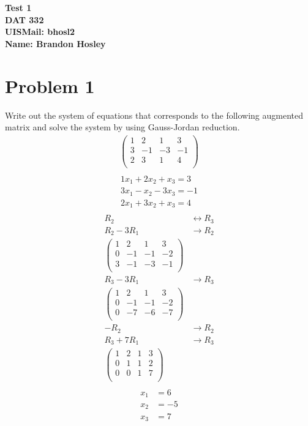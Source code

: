 \documentclass[]{article}
\title{}
\author{}
\begin{document}
	\textbf{
	{\Large Test 1} \\
	DAT 332 \\
	UISMail: bhosl2 \\
	Name: Brandon Hosley
}
\section{Problem 1}
Write out the system of equations that corresponds to the following augmented matrix and solve the system by using Gauss-Jordan reduction.
\begin{align*}
	\begin{pmatrix}
	1 & 2 & 1 & 3 \\
	3 & -1& -3& -1 \\
	2 & 3 & 1 & 4 \\
	\end{pmatrix} \\
\end{align*}
\begin{align}
1x_{1} + 2x_{2} + x_{3} = 3 \\
3x_{1} - x_{2} - 3x_{3} = -1 \\
2x_{1} + 3x_{2} + x_{3} = 4 \\
\end{align}
\begin{align*}
	R_2 &\leftrightarrow R_3 \\
	R_2 - 3R_1 &\rightarrow R_2 \\
	\begin{pmatrix}
		1 & 2 & 1 & 3 \\
		0 &-1 &-1 & -2 \\
		3 &-1 &-3 & -1 \\
	\end{pmatrix} \\
	R_3 - 3R_1 &\rightarrow R_3 \\
	\begin{pmatrix}
		1 & 2 & 1 & 3 \\
		0 &-1 &-1 & -2 \\
		0 &-7 &-6 & -7 \\
	\end{pmatrix} \\
	-R_2 &\rightarrow R_2 \\
	R_3 + 7R_1 &\rightarrow R_3 \\
	\begin{pmatrix}
		1 & 2 & 1 & 3 \\
		0 & 1 & 1 & 2 \\
		0 & 0 & 1 & 7 \\
	\end{pmatrix} \\
\end{align*}
\begin{align*}
x_{1} &= 6 \\
x_{2} &= -5 \\
x_{3} &= 7 \\
\end{align*}
\end{document}
